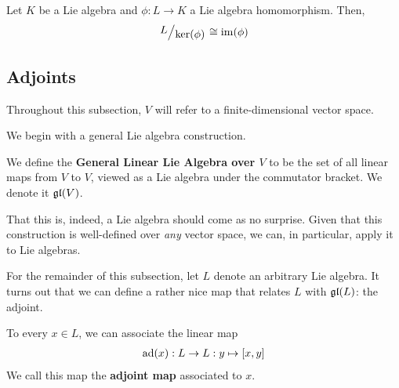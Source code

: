 \begin{boxtheorem}\label{SP:Thm:FirstIsomorphism}
    Let $K$ be a Lie algebra and $\phi : L \to K$ a Lie algebra homomorphism. Then,
    \begin{align}
        \quotient{L}{\pker{\phi}} \cong \pim{\phi}
        \label{SP:Eq:FirstIsomorphism}
    \end{align}
\end{boxtheorem}

\subsection{Adjoints}

Throughout this subsection, $V$ will refer to a finite-dimensional vector space.

We begin with a general Lie algebra construction.

\begin{boxdefinition}\label{Ch1:Def:gl_V}
    We define the \textbf{General Linear Lie Algebra over $V$} to be the set of all linear maps from $V$ to $V$, viewed as a Lie algebra under the commutator bracket. We denote it $\mathfrak{gl}\!\left( V \right)$.
\end{boxdefinition}

That this is, indeed, a Lie algebra should come as no surprise. Given that this construction is well-defined over \textit{any} vector space, we can, in particular, apply it to Lie algebras.

For the remainder of this subsection, let $L$ denote an arbitrary Lie algebra. It turns out that we can define a rather nice map that relates $L$ with $\mathfrak{gl}\!\left( L \right)$: the adjoint.

\begin{boxdefinition}
    To every $x \in L$, we can associate the linear map
    \begin{align*}
        \operatorname{ad}\!\left( x \right) : L \to L : y \mapsto \left[ x, y \right]
    \end{align*}
    We call this map the \textbf{adjoint map} associated to $x$.
\end{boxdefinition}

